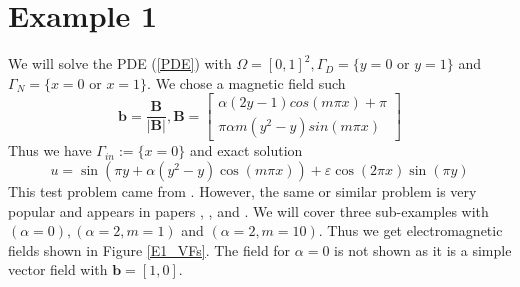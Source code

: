 \documentclass[12pt]{ociamthesis}
\begin{document}
\section{Example 1}
We will solve the PDE (\ref{PDE}) with $\Omega = [0,1]^2, \Gamma_D = \{y=0 \text{ or } y=1\}$ and $\Gamma_N = \{x=0 \text{ or } x=1\}$. We chose a magnetic field such
\begin{equation} \label{E1_b}
\mathbf{b} = \frac{\mathbf{B}}{|\mathbf{B}|}, 
\mathbf{B} = \left[ \begin{matrix}
\alpha(2y-1)cos(m\pi x) + \pi\\
\pi \alpha m (y^2-y)sin(m \pi x)
\end{matrix} \right]
\end{equation}
Thus we have $\Gamma_{in} := \{x=0\}$ and exact solution
\begin{equation} \label{E1_u}
u = \sin(\pi y + \alpha (y^2-y) \cos(m\pi x)) + \varepsilon \cos(2 \pi x) \sin(\pi y)
\end{equation}
This test problem came from \cite{DN}. However, the same or similar problem is very popular and appears in papers \cite{LINE_INT}, \cite{AP}, \cite{MMAP} and \cite{STAB}. We will cover three sub-examples with $(\alpha=0),(\alpha=2,m=1)$ and $(\alpha = 2, m=10)$. Thus we get electromagnetic fields  shown in Figure \ref{E1_VFs}. The field for $\alpha = 0$ is not shown as it is a simple vector field with $\mathbf{b}= [1, 0]$.
\end{document}
